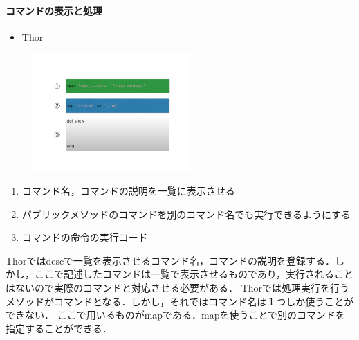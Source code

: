 \paragraph{コマンドの表示と処理}
\begin{itemize}
\item Thor
\end{itemize}
\begin{figure}[htbp]\begin{center}
\includegraphics[width=6cm,bb=0 0 442 500]{../figs/./hikiutils_yamane.002.jpg}
\caption{}
\label{default}\end{center}\end{figure}
\begin{enumerate}
\item コマンド名，コマンドの説明を一覧に表示させる
\item パブリックメソッドのコマンドを別のコマンド名でも実行できるようにする
\item コマンドの命令の実行コード
\end{enumerate}
Thorではdescで一覧を表示させるコマンド名，コマンドの説明を登録する．しかし，ここで記述したコマンドは一覧で表示させるものであり，実行されることはないので実際のコマンドと対応させる必要がある．
Thorでは処理実行を行うメソッドがコマンドとなる．しかし，それではコマンド名は１つしか使うことができない．
ここで用いるものがmapである．mapを使うことで別のコマンドを指定することができる．

